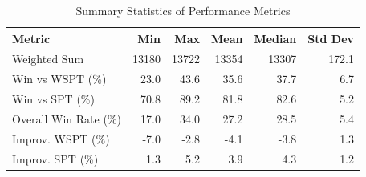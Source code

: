 \begin{table}[htbp]%
\centering%
\begin{tabular}{lrrrrr}%
\toprule%
\textbf{Metric}&\textbf{Min}&\textbf{Max}&\textbf{Mean}&\textbf{Median}&\textbf{Std Dev}\\%
\midrule%
Weighted Sum&13180&13722&13354&13307&172.1\\%
Win vs WSPT (\%)&23.0&43.6&35.6&37.7&6.7\\%
Win vs SPT (\%)&70.8&89.2&81.8&82.6&5.2\\%
Overall Win Rate (\%)&17.0&34.0&27.2&28.5&5.4\\%
Improv. WSPT (\%)&-7.0&-2.8&-4.1&-3.8&1.3\\%
Improv. SPT (\%)&1.3&5.2&3.9&4.3&1.2\\%
\bottomrule%
\end{tabular}%
\caption{Summary Statistics of Performance Metrics}%
\label{tab:metrics}%
\end{table}